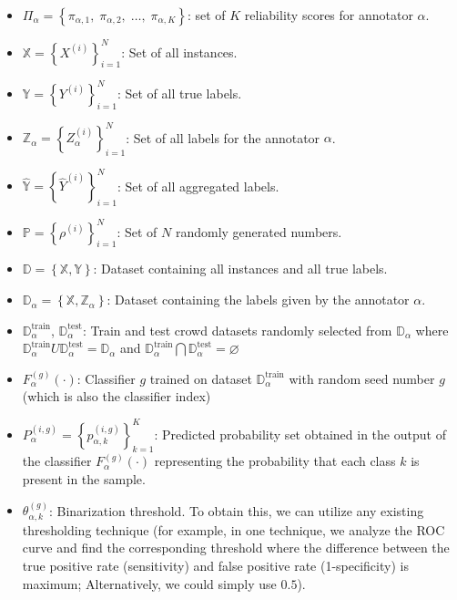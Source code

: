 \begin{itemize}
    \item  ${\Pi}_\alpha=\left\{\pi_{\alpha,1},\;\pi_{\alpha,2},\;\dots,\;\pi_{\alpha,K}\right\} $: set of $K $ reliability scores for annotator $\alpha $.

    \item  $\mathbb{X}=\left\{X^{(i)}\right\}_{i=1}^{N} $: Set of all instances.

    \item  $\mathbb{Y}=\left\{Y^{(i)}\right\}_{i=1}^{N} $: Set of all true labels.

    \item  $\mathbb{Z}_\alpha=\left\{Z_\alpha^{(i)}\right\}_{i=1}^{N} $: Set of all labels for the annotator $\alpha $.

    \item  $\widehat{\mathbb{Y}}= \left\{\widehat{Y}^{(i)}\right\}_{i=1}^{N} $: Set of all aggregated labels.

    \item  $\mathbb{P}=\left\{\rho^{(i)}\right\}_{i=1}^{N} $: Set of $N $ randomly generated numbers.

    \item  $\mathbb{D}=\left\{\mathbb{X},\mathbb{Y}\right\} $: Dataset containing all instances and all true labels.

    \item  $\mathbb{D}_\alpha=\left\{\mathbb{X},\mathbb{Z}_\alpha\right\} $: Dataset containing the labels given by the annotator $\alpha $.

    \item  $\mathbb{D}_\alpha^\text{train}$, $\mathbb{D}_\alpha^{\text{test}} $: Train and test crowd datasets randomly selected from $\mathbb{D}_{\alpha} $ where $\mathbb{D}_\alpha^{\text{train}} U \mathbb{D}_\alpha^{\text{test}} = \mathbb{D}_\alpha $ and $\mathbb{D}_\alpha^{\text{train}} \bigcap \mathbb{D}_{\alpha}^{\text{test}}=\varnothing $

    \item  $F_{\alpha}^{(g)}(\cdot)$: Classifier $g $ trained on dataset $\mathbb{D}_{\alpha}^{\mathrm{train}} $ with random seed number $g $ (which is also the classifier index)

    \item  $P_{\alpha}^{(i,g)} = \left\{ p_{\alpha,k}^{(i,g)} \right\}_{k=1}^{K} $: Predicted probability set obtained in the output of the classifier $F_{\alpha}^{(g)}(\cdot) $ representing the probability that each class $k $ is present in the sample.

    \item  $\theta_{\alpha,k}^{(g)} $: Binarization threshold. To obtain this, we can utilize any existing thresholding technique (for example, in one technique, we analyze the ROC curve and find the corresponding threshold where the difference between the true positive rate (sensitivity) and false positive rate (1-specificity) is maximum; Alternatively, we could simply use $0.5 $).


\end{itemize}
